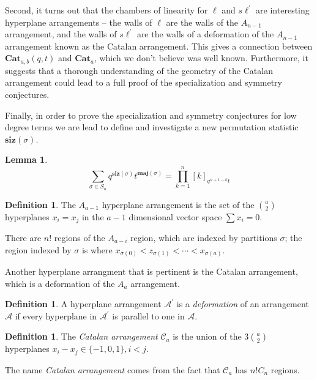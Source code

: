 \documentclass{amsart}[12pt]
\theoremstyle{definition}
\newtheorem{lemma}[dummy]{Lemma}
\newtheorem{definition}[dummy]{Definition}
\newcommand{\Cat}{\mathbf{Cat}}
\newcommand{\sk}{s\ell}
\newcommand{\maj}{\mathbf{maj}}
\newcommand{\siz}{\mathbf{siz}}
\begin{document}
Second, it turns out that the chambers of linearity for $\ell$ and $\sk^\prime$ are interesting hyperplane arrangements -- the walls of $\ell$ are the walls of the $A_{n-1}$ arrangement, and the walls of $\sk^\prime$ are the walls of a deformation of the $A_{n-1}$ arrangement known as the Catalan arrangement.  This gives a connection between $\Cat_{a,b}(q,t)$ and $\Cat_a$, which we don't believe was well known.  Furthermore, it suggests that a thorough understanding of the geometry of the Catalan arrangement could lead to a full proof of the specialization and symmetry conjectures.

Finally, in order to prove the specialization and symmetry conjectures for low degree terms we are lead to define and investigate a new permutation statistic $\siz(\sigma)$.  

\begin{lemma}
$$\sum_{\sigma\in S_n} q^{\siz(\sigma)}t^{\maj(\sigma)}=\prod_{k=1}^n [k]_{q^{n+1-k}t}$$ 
\end{lemma}









\begin{definition}
The $A_{a-1}$ hyperplane arrangement is the set of the $\binom{a}{2}$ hyperplanes $x_i=x_j$ in the $a-1$ dimensional vector space $\sum x_i=0$.

There are $n!$ regions of the $A_{a-i}$ region, which are indexed by partitions $\sigma$; the region indexed by $\sigma$ is where $x_{\sigma(0)}<z_{\sigma(1)}<\cdots<x_{\sigma(a)}$.
\end{definition}

Another hyperplane arrangment that is pertinent is the Catalan arrangement, which is a deformation of the $A_a$ arrangement.

\begin{definition}
A hyperplane arrangement $\mathcal{A}^\prime$ is a \emph{deformation} of an arrangement $\mathcal{A}$ if every hyperplane in $\mathcal{A}^\prime$ is parallel to one in $\mathcal{A}$.
\end{definition}

\begin{definition} \label{def:arrangements}
The \emph{Catalan arrangement} $\mathcal{C}_a$ is the union of the $3\binom{a}{2}$ hyperplanes $x_i-x_j\in\{-1,0,1\}, i<j$.
\end{definition}

The name \emph{Catalan arrangement} comes from the fact that $\mathcal{C}_a$ has $n!C_n$ regions.
\end{document}
